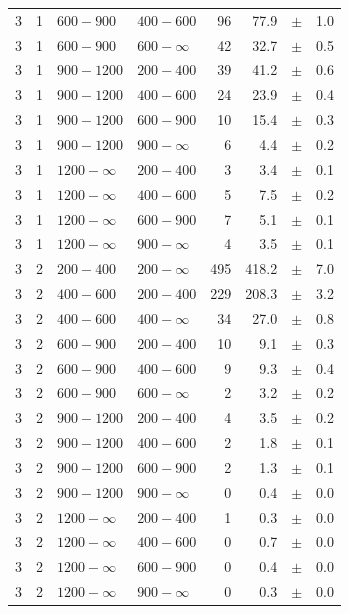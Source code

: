 \begin{table}[!h]
\begin{tabular}{rrllrrcl}
3 & 1 & $ 600- 900$ & $400-600$ &     96 &     77.9 &$\pm$&    1.0 \\
3 & 1 & $ 600- 900$ & $600-\infty$ &     42 &     32.7 &$\pm$&    0.5 \\
3\T & 1 & $ 900-1200$ & $200-400$ &     39 &     41.2 &$\pm$&    0.6 \\
3 & 1 & $ 900-1200$ & $400-600$ &     24 &     23.9 &$\pm$&    0.4 \\
3 & 1 & $ 900-1200$ & $600-900$ &     10 &     15.4 &$\pm$&    0.3 \\
3 & 1 & $ 900-1200$ & $900-\infty$ &      6 &      4.4 &$\pm$&    0.2 \\
3\T & 1 & $1200- \infty$ & $200-400$ &      3 &      3.4 &$\pm$&    0.1 \\
3 & 1 & $1200- \infty$ & $400-600$ &      5 &      7.5 &$\pm$&    0.2 \\
3 & 1 & $1200- \infty$ & $600-900$ &      7 &      5.1 &$\pm$&    0.1 \\
3 & 1 & $1200- \infty$ & $900-\infty$ &      4 &      3.5 &$\pm$&    0.1 \\
3\T & 2 & $ 200- 400$ & $200-\infty$ &    495 &    418.2 &$\pm$&    7.0 \\
3\T & 2 & $ 400- 600$ & $200-400$ &    229 &    208.3 &$\pm$&    3.2 \\
3 & 2 & $ 400- 600$ & $400-\infty$ &     34 &     27.0 &$\pm$&    0.8 \\
3\T & 2 & $ 600- 900$ & $200-400$ &     10 &      9.1 &$\pm$&    0.3 \\
3 & 2 & $ 600- 900$ & $400-600$ &      9 &      9.3 &$\pm$&    0.4 \\
3 & 2 & $ 600- 900$ & $600-\infty$ &      2 &      3.2 &$\pm$&    0.2 \\
3\T & 2 & $ 900-1200$ & $200-400$ &      4 &      3.5 &$\pm$&    0.2 \\
3 & 2 & $ 900-1200$ & $400-600$ &      2 &      1.8 &$\pm$&    0.1 \\
3 & 2 & $ 900-1200$ & $600-900$ &      2 &      1.3 &$\pm$&    0.1 \\
3 & 2 & $ 900-1200$ & $900-\infty$ &      0 &      0.4 &$\pm$&    0.0 \\
3\T & 2 & $1200- \infty$ & $200-400$ &      1 &      0.3 &$\pm$&    0.0 \\
3 & 2 & $1200- \infty$ & $400-600$ &      0 &      0.7 &$\pm$&    0.0 \\
3 & 2 & $1200- \infty$ & $600-900$ &      0 &      0.4 &$\pm$&    0.0 \\
3 & 2 & $1200- \infty$ & $900-\infty$ &      0 &      0.3 &$\pm$&    0.0 \\

\end{tabular}
\end{table}
